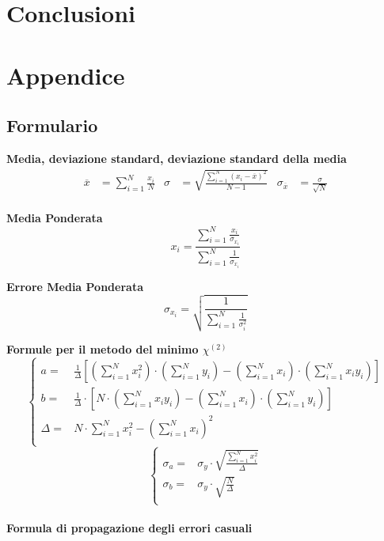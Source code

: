 \documentclass[a4paper,11pt,oneside]{article}
\begin{document}
\section{Conclusioni}


\section{Appendice}
\subsection{Formulario}
\textbf{Media, deviazione standard, deviazione standard della media}
\begin{align*}
        \overline{x}&=\sum\limits_{i=1}^{N} \frac{x_{i}}{N}&
        \sigma&=\sqrt{\frac{\sum\limits_{i=1}^{N} (x_{i}-\overline{x})^2}{N-1}}&
        \sigma_{\overline{x}}&=\frac{\sigma}{\sqrt{N}}
\end{align*}\\

\textbf{Media Ponderata}
\begin{equation*}
\label{eq:media_pond}
    x_i=\frac{\sum_{i=1}^{N}\frac{x_i}{\sigma_{x_i}}}{\sum_{i=1}^{N}\frac{1}{\sigma_{x_i}}}
\end{equation*}

\textbf{Errore Media Ponderata}
\begin{equation*}
\label{eq:errore_media_pond}
     \sigma_{x_i}=\sqrt{\frac{1}{\sum_{i=1}^{N}\frac{1}{\sigma_{i}^{2}}}}
\end{equation*}

\textbf{Formule per il metodo del minimo ${\chi}^{(2)}$}
\begin{equation*}
        \begin{cases}
    a=&\frac{1}{\Delta}[(\sum\limits_{i=1}^{N}{x_{i}^{2}})\cdot(\sum\limits_{i=1}^{N}{y_{i}})-(\sum\limits_{i=1}^{N}{x_{i}})\cdot(\sum\limits_{i=1}^{N}{x_{i}y_{i}})] \\ 
    b=&\frac{1}{\Delta }\cdot \left [N\cdot \left ( \sum\limits_{i=1}^{N}x_i y_i \right )-\left ( \sum\limits_{i=1}^{N}x_i \right )\cdot \left ( \sum\limits_{i=1}^{N}y_i \right )  \right ]\\
    \Delta=& N\cdot \sum\limits_{i=1}^{N} x_i^{2} - \left ( \sum\limits_{i=1}^{N}x_i \right )^{2}\\
    \end{cases}
\end{equation*}
\begin{equation*}
    \begin{cases}
    \sigma_{a}=&\sigma_{y}\cdot\sqrt{\frac{\sum_{i=1}^{N}{x_{i}^{2}}}{\Delta}} \\
    \sigma_{b}=&\sigma_y\cdot \sqrt{\frac{N}{\Delta }}\\
    \end{cases}
    \label{equation:err_chi_quadro}
\end{equation*}
\\
\textbf{Formula di propagazione degli errori casuali}\\
\end{document}
